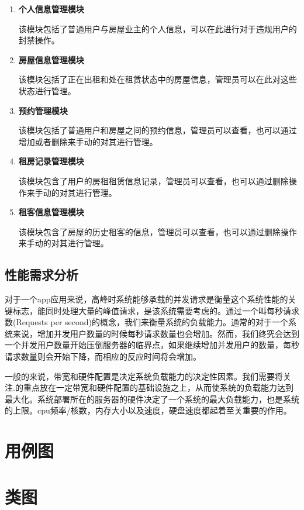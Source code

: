 \documentclass[lang=cn,11pt,a4paper,cite=authoryear]{elegantpaper}
\begin{document}
\begin{enumerate}
	\def\labelenumi{\arabic{enumi}.}
	\item
	\textbf{个人信息管理模块}
	
	该模块包括了普通用户与房屋业主的个人信息，可以在此进行对于违规用户的封禁操作。
	\item
	\textbf{房屋信息管理模块}
	
	该模块包括了正在出租和处在租赁状态中的房屋信息，管理员可以在此对这些状态进行管理。
	\item
	\textbf{预约管理模块}
	
	该模块包括了普通用户和房屋之间的预约信息，管理员可以查看，也可以通过增加或者删除来手动的对其进行管理。
	\item
	\textbf{租房记录管理模块}
	
	该模块包含了用户的房租租赁信息记录，管理员可以查看，也可以通过删除操作来手动的对其进行管理。
	\item
	\textbf{租客信息管理模块}
	
	该模块包含了房屋的历史租客的信息，管理员可以查看，也可以通过删除操作来手动的对其进行管理。
\end{enumerate}

\subsection{性能需求分析}

对于一个app应用来说，高峰时系统能够承载的并发请求是衡量这个系统性能的关键标志，能同时处理大量的峰值请求，是该系统需要考虑的。通过一个叫每秒请求数(Requests
per
second)的概念，我们来衡量系统的负载能力。通常的对于一个系统来说，增加并发用户数量的时候每秒请求数量也会增加。然而，我们终究会达到一个并发用户数量开始压倒服务器的临界点，如果继续增加并发用户的数量，每秒请求数量则会开始下降，而相应的反应时间将会增加。

一般的来说，带宽和硬件配置是决定系统负载能力的决定性因素。我们需要将关注.的重点放在一定带宽和硬件配置的基础设施之上，从而使系统的负载能力达到最大化。系统部署所在的服务器的硬件决定了一个系统的最大负载能力，也是系统的上限。cpu频率/核数，内存大小以及速度，硬盘速度都起着至关重要的作用。

\section{用例图}

\section{类图}
\end{document}
